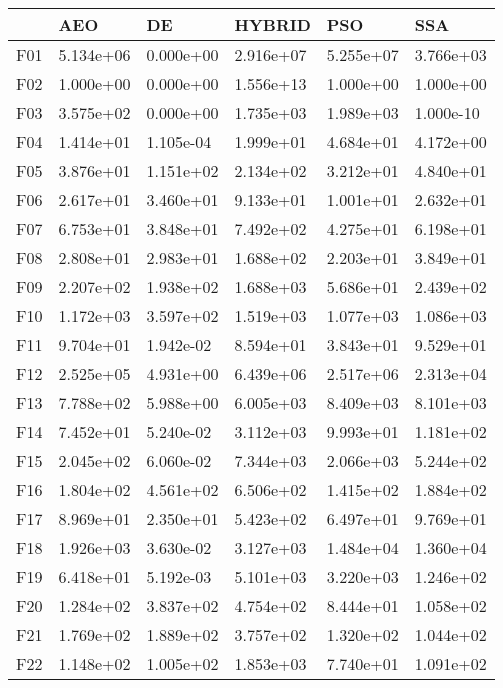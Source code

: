 \begin{tabular}{llllll}
\toprule
{} &        AEO &         DE &     HYBRID &        PSO &        SSA \\
\midrule
F01  &  5.134e+06 &  0.000e+00 &  2.916e+07 &  5.255e+07 &  3.766e+03 \\
F02  &  1.000e+00 &  0.000e+00 &  1.556e+13 &  1.000e+00 &  1.000e+00 \\
F03  &  3.575e+02 &  0.000e+00 &  1.735e+03 &  1.989e+03 &  1.000e-10 \\
F04  &  1.414e+01 &  1.105e-04 &  1.999e+01 &  4.684e+01 &  4.172e+00 \\
F05  &  3.876e+01 &  1.151e+02 &  2.134e+02 &  3.212e+01 &  4.840e+01 \\
F06  &  2.617e+01 &  3.460e+01 &  9.133e+01 &  1.001e+01 &  2.632e+01 \\
F07  &  6.753e+01 &  3.848e+01 &  7.492e+02 &  4.275e+01 &  6.198e+01 \\
F08  &  2.808e+01 &  2.983e+01 &  1.688e+02 &  2.203e+01 &  3.849e+01 \\
F09  &  2.207e+02 &  1.938e+02 &  1.688e+03 &  5.686e+01 &  2.439e+02 \\
F10  &  1.172e+03 &  3.597e+02 &  1.519e+03 &  1.077e+03 &  1.086e+03 \\
F11  &  9.704e+01 &  1.942e-02 &  8.594e+01 &  3.843e+01 &  9.529e+01 \\
F12  &  2.525e+05 &  4.931e+00 &  6.439e+06 &  2.517e+06 &  2.313e+04 \\
F13  &  7.788e+02 &  5.988e+00 &  6.005e+03 &  8.409e+03 &  8.101e+03 \\
F14  &  7.452e+01 &  5.240e-02 &  3.112e+03 &  9.993e+01 &  1.181e+02 \\
F15  &  2.045e+02 &  6.060e-02 &  7.344e+03 &  2.066e+03 &  5.244e+02 \\
F16  &  1.804e+02 &  4.561e+02 &  6.506e+02 &  1.415e+02 &  1.884e+02 \\
F17  &  8.969e+01 &  2.350e+01 &  5.423e+02 &  6.497e+01 &  9.769e+01 \\
F18  &  1.926e+03 &  3.630e-02 &  3.127e+03 &  1.484e+04 &  1.360e+04 \\
F19  &  6.418e+01 &  5.192e-03 &  5.101e+03 &  3.220e+03 &  1.246e+02 \\
F20  &  1.284e+02 &  3.837e+02 &  4.754e+02 &  8.444e+01 &  1.058e+02 \\
F21  &  1.769e+02 &  1.889e+02 &  3.757e+02 &  1.320e+02 &  1.044e+02 \\
F22  &  1.148e+02 &  1.005e+02 &  1.853e+03 &  7.740e+01 &  1.091e+02 \\

\end{tabular}
